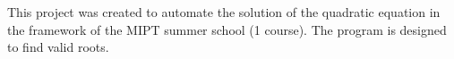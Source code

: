 This project was created to automate the solution of the quadratic equation in the framework of the MIPT summer school (1 course). The program is designed to find valid roots. 
